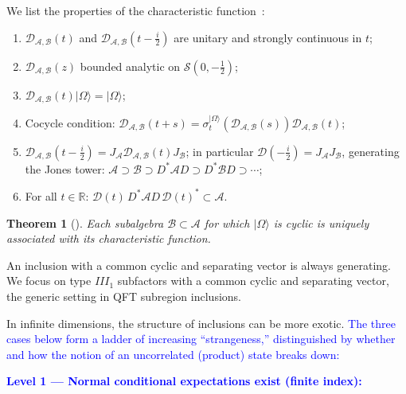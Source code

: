 \documentclass[a4paper,11pt]{article}
\newtheorem{theorem}{Theorem}
\theoremstyle{definition}
\theoremstyle{remark}
\begin{document}
We list the properties of the characteristic function~\cite{revolutionizing}:
\begin{enumerate}
    \item $\mathcal{D}_{\mathcal{A},\mathcal{B}}(t)$ and
    $\mathcal{D}_{\mathcal{A}, \mathcal{B}}(t - \frac{i}{2})$ are unitary and strongly
    continuous in $t$;
    \item $\mathcal{D}_{\mathcal{A},\mathcal{B}}(z)$ bounded analytic on $\mathcal{S}(0,-\frac{1}{2})$;
    \item $\mathcal{D}_{\mathcal{A},\mathcal{B}}(t)|\Omega\rangle = |\Omega\rangle$;
    \item Cocycle condition:
    $\mathcal{D}_{\mathcal{A},\mathcal{B}}(t+s)
    = \sigma_t^{|\Omega\rangle}(\mathcal{D}_{\mathcal{A},\mathcal{B}}(s))
      \mathcal{D}_{\mathcal{A},\mathcal{B}}(t)$;
    \item $\mathcal{D}_{\mathcal{A},\mathcal{B}}(t - \frac{i}{2})
    = J_\mathcal{A}\mathcal{D}_{\mathcal{A},\mathcal{B}}(t)J_\mathcal{B}$; in particular
    $\mathcal{D}(-\frac{i}{2}) = J_\mathcal{A}J_\mathcal{B}$, generating the Jones tower:
    $\mathcal{A}\supset\mathcal{B} \supset D^*\mathcal{A}D \supset D^*\mathcal{B}D\supset\cdots$;
    \item For all $t\in\mathbb{R}$: $\mathcal{D}(t)\,D^*\mathcal{A}D\,\mathcal{D}(t)^*\subset\mathcal{A}$.
\end{enumerate}
 
\begin{theorem}[\cite{revolutionizing}]\label{thm:char-fn-unique}
Each subalgebra $\mathcal{B}\subset\mathcal{A}$ for which $|\Omega\rangle$ is cyclic
is uniquely associated with its characteristic function.
\end{theorem}
 
An inclusion with a common cyclic and separating vector is always generating.  We
focus on type $III_1$ subfactors with a common cyclic and separating vector, the
generic setting in QFT subregion inclusions.
 
In infinite dimensions, the structure of inclusions can be more exotic. \textcolor{blue}{The
three cases below form a ladder of increasing ``strangeness,'' distinguished by whether
and how the notion of an uncorrelated (product) state breaks down:}
 
\textcolor{blue}{\medskip
\noindent\textbf{Level 1 — Normal conditional expectations exist (finite index):}}
 
\end{document}
